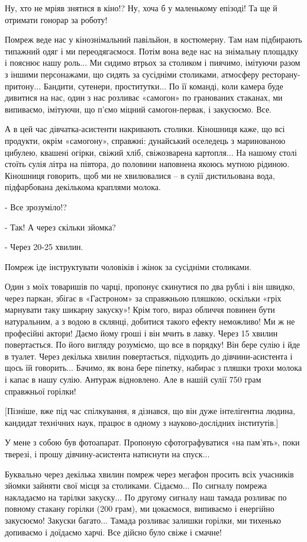 Ну, хто не мріяв знятися в кіно!? Ну, хоча б у маленькому епізоді! Та ще й
отримати гонорар за роботу!

Помреж веде нас у кінознімальний павільйон, в костюмерну. Там нам підбирають
типажний одяг і ми переодягаємося. Потім вона веде нас на знімальну площадку і
пояснює нашу роль... Ми сидимо втрьох за столиком і пиячимо, імітуючи разом з
іншими персонажами, що сидять за сусідніми столиками, атмосферу
ресторану-притону... Бандити, сутенери, проститутки... По її команді, коли камера
буде дивитися на нас, один з нас розливає «самогон» по гранованих стаканах, ми
випиваємо, імітуючи, що п’ємо міцний самогон-первак, і закусюємо. Все.

А в цей час дівчатка-асистенти накривають столики. Кіношниця каже, що всі
продукти, окрім «самогону», справжні: дунайський оселедець з маринованою
цибулею, квашені огірки, свіжий хліб, свіжозварена картопля... На нашому столі
стоїть сулія літра на півтора, до половини наповнена якоюсь мутною рідиною.
Кіношниця говорить, щоб ми не хвилювалися – в сулії дистильована вода,
підфарбована декількома краплями молока. 

- Все зрозуміло!?

- Так! А через скільки зйомка?

- Через 20-25 хвилин.

Помреж іде інструктувати чоловіків і жінок за сусідніми столиками. 

Один з моїх товаришів по чарці, пропонує скинутися по два рублі і він швидко,
через паркан, збігає в «Гастроном» за справжньою пляшкою, оскільки «гріх
марнувати таку шикарну закуску»! Крім того, вираз обличчя повинен бути
натуральним, а з водою в склянці, добитися такого ефекту неможливо! Ми ж не
професійні актори! Даємо йому гроші і він мчить в лавку. Через 15 хвилин
повертається. По його вигляду розуміємо, що все в порядку! Він бере сулію і йде
в туалет. Через декілька хвилин повертається, підходить до дівчини-асистента і
щось їй говорить... Бачимо, як вона бере піпетку, набирає з пляшки трохи молока і
капає в нашу сулію. Антураж відновлено. Але в нашій сулії 750 грам справжньої
горілки!

[Пізніше, вже під час спілкування, я дізнався, що він дуже інтелігентна людина,
кандидат технічних наук, працює в одному з науково-дослідних інститутів.]

У мене з собою був фотоапарат. Пропоную сфотографуватися «на пам’ять», поки
тверезі, і прошу дівчину-асистента натиснути на спуск...  

Буквально через декілька хвилин помреж через мегафон просить всіх учасників
зйомки зайняти свої місця за столиками. Сідаємо... По сигналу помрежа накладаємо
на тарілки закуску... По другому сигналу наш тамада розливає по повному стакану
горілки (200 грам), ми цокаємося, випиваємо і енергійно закусюємо! Закуски
багато... Тамада розливає залишки горілки, ми тихенько допиваємо і доїдаємо
харчі. Все дійсно було свіже і смачне! 

